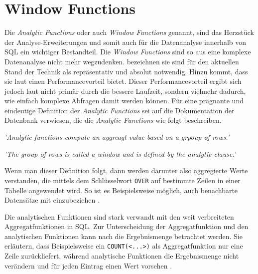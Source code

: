 \section{Window Functions}
\label{sec:window_functions} Die \textit{Analytic Functions} oder auch \textit{Window
Functions} genannt, sind das Herzstück der Analyse-Erweiterungen und somit auch
für die Datenanalyse innerhalb von SQL ein wichtiger Bestandteil. Die \textit{Window
Functions} sind so aus eine komplexe Datenanalyse nicht mehr wegzudenken. \citet[Abstract]{cao2012optimization}
bezeichnen sie sind für den aktuellen Stand der Technik als repräsentativ und absolut
notwendig. Hinzu kommt, dass sie laut \citet[Kapitel 8]{kellenberger2019expert} einen
Performancevorteil bietet. Dieser Performancevorteil ergibt sich jedoch laut
\citet[Kapitel 8]{kellenberger2019expert} nicht primär durch die bessere
Laufzeit, sondern vielmehr dadurch, wie einfach komplexe Abfragen damit werden
können. Für eine prägnante und eindeutige Definition der \textit{Analytic
Functions} sei auf die Dokumentation der \citet{oracle} Datenbank verwiesen, die
die \textit{Analytic Functions} wie folgt beschreiben.
\begin{center}
	\textit{ 'Analytic functions compute an aggreagt value based on a grpoup of
	rows.' } \\ \citep{oracle}

	\textit{ 'The group of rows is called a window and is defined by the analytic-clause.'
	} \\ \citep{oracle}
\end{center}
Wenn man dieser Definition folgt, dann werden darunter also aggregierte Werte verstanden,
die mittels dem Schlüsselwort \texttt{OVER} auf bestimmte Zeilen in einer Tabelle
angewendet wird. So ist es Beispielsweise möglich, auch benachbarte Datensätze mit
einzubeziehen \citep{oracle}.

Die analytischen Funktionen sind stark verwandt mit den weit verbreiteten
Aggregatfunktionen in SQL. Zur Unterscheidung der Aggregatfunktion und den analytischen
Funktionen kann nach \citet{Nuijten2023} die Ergebnismenge betrachtet werden. Sie
erläutern, dass Beispielsweise ein \texttt{COUNT(<...>)} als Aggregatfunktion nur
eine Zeile zurückliefert, während analytische Funktionen die Ergebnismenge nicht
verändern und für jeden Eintrag einen Wert vorsehen \citep{Nuijten2023}.

